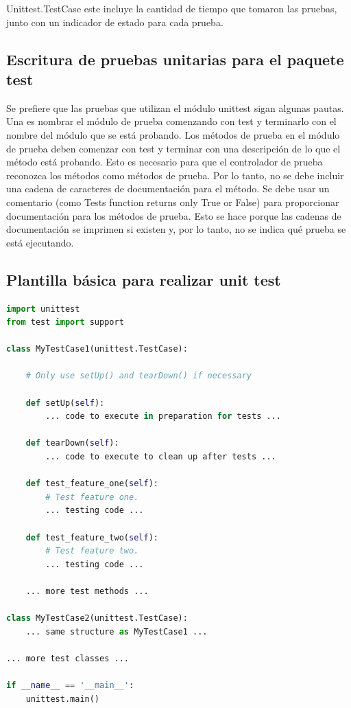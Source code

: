 \documentclass[conference]{IEEEtran}
\begin{document}
Unittest.TestCase este incluye la cantidad de tiempo que tomaron las pruebas, junto con un indicador de estado para cada prueba. 

\subsection{Escritura de pruebas unitarias para el paquete test}

Se prefiere que las pruebas que utilizan el módulo unittest sigan algunas pautas. Una es nombrar el módulo de prueba comenzando con test y terminarlo con el nombre del módulo que se está probando. Los métodos de prueba en el módulo de prueba deben comenzar con test y terminar con una descripción de lo que el método está probando. Esto es necesario para que el controlador de prueba reconozca los métodos como métodos de prueba. Por lo tanto, no se debe incluir una cadena de caracteres de documentación para el método. Se debe usar un comentario (como Tests function returns only True or False) para proporcionar documentación para los métodos de prueba. Esto se hace porque las cadenas de documentación se imprimen si existen y, por lo tanto, no se indica qué prueba se está ejecutando.

\subsection{Plantilla básica para realizar unit test}

\begin{lstlisting}[language=Python,basicstyle=\scriptsize, breaklines=true,
    postbreak=\mbox{\textcolor{red}{$\hookrightarrow$}\space}]
import unittest
from test import support

class MyTestCase1(unittest.TestCase):

    # Only use setUp() and tearDown() if necessary

    def setUp(self):
        ... code to execute in preparation for tests ...

    def tearDown(self):
        ... code to execute to clean up after tests ...

    def test_feature_one(self):
        # Test feature one.
        ... testing code ...

    def test_feature_two(self):
        # Test feature two.
        ... testing code ...

    ... more test methods ...

class MyTestCase2(unittest.TestCase):
    ... same structure as MyTestCase1 ...

... more test classes ...

if __name__ == '__main__':
    unittest.main()

\end{lstlisting}
\end{document}
